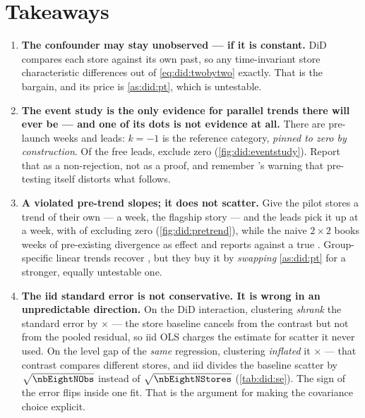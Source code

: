 \section{Takeaways}
\label{sec:did:take}

\begin{enumerate}[leftmargin=*, itemsep=.45em]
  \item \textbf{The confounder may stay unobserved --- if it is constant.} DiD compares each store
        against its own past, so any time-invariant store characteristic differences out of
        \cref{eq:did:twobytwo} exactly. That is the bargain, and its price is \cref{as:did:pt},
        which is untestable.

  \item \textbf{The event study is the only evidence for parallel trends there will ever be --- and
        one of its dots is not evidence at all.} There are \nbEightEsNPre{} pre-launch weeks and
        \nbEightEsNLeads{} leads: $k = -1$ is the reference category, \emph{pinned to zero by
        construction}. Of the \nbEightEsNLeads{} free leads, \nbEightEsLeadsOut{} exclude zero
        (\cref{fig:did:eventstudy}). Report that as a non-rejection, not as a proof, and remember
        \citeauthor{roth2022}'s warning that pre-testing itself distorts what follows.

  \item \textbf{A violated pre-trend slopes; it does not scatter.} Give the pilot stores a trend of
        their own --- \eur{\nbEightPtSlope} a week, the flagship story --- and the leads pick it up
        at \eur{\nbEightPtSlopeHat} a week, with \nbEightPtLeadsOut{} of \nbEightPtNLeads{} excluding
        zero (\cref{fig:did:pretrend}), while the naive $2 \times 2$ books \nbEightLaunch{} weeks of
        pre-existing divergence as effect and reports \eur{\nbEightPtDid} against a true
        \eur{\nbEightTrueEffect}. Group-specific linear trends recover \eur{\nbEightPtFixed}, but
        they buy it by \emph{swapping} \cref{as:did:pt} for a stronger, equally untestable one.

  \item \textbf{The iid standard error is not conservative. It is wrong in an unpredictable
        direction.} On the DiD interaction, clustering \emph{shrank} the standard error by
        \nbEightSeShrinkDid$\times$ --- the store baseline cancels from the contrast but not from
        the pooled residual, so iid OLS charges the estimate for scatter it never used. On the level
        gap of the \emph{same} regression, clustering \emph{inflated} it \nbEightSeRatioLevel$\times$
        --- that contrast compares different stores, and iid divides the baseline scatter by
        $\sqrt{\nbEightNObs}$ instead of $\sqrt{\nbEightNStores}$ (\cref{tab:did:se}). The sign of
        the error flips inside one fit. That is the argument for making the covariance choice
        explicit.


\end{enumerate}
